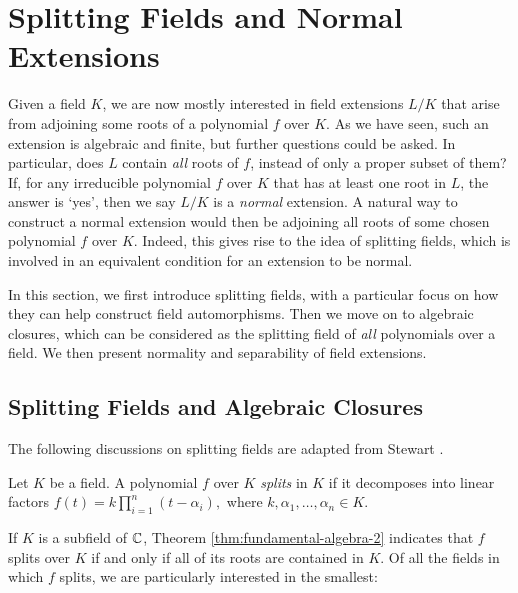 \section{Splitting Fields and Normal Extensions} \label{sec:normal}

Given a field $K$, we are now mostly interested in field extensions $L/K$ that arise from adjoining some roots of a polynomial $f$ over $K$. As we have seen, such an extension is algebraic and finite, but further questions could be asked. In particular, does $L$ contain \textit{all} roots of $f$, instead of only a proper subset of them? If,  for any irreducible polynomial $f$ over $K$ that has at least one root in $L$, the answer is `yes', then we say $L/K$ is a \textit{normal} extension. 
A natural way to construct a normal extension would then be adjoining all roots of some chosen polynomial $f$ over $K$. Indeed, this gives rise to the idea of splitting fields, which is involved in an equivalent condition for an extension to be normal. 

In this section, we first introduce splitting fields, with a particular focus on how they can help construct field automorphisms. Then we move on to algebraic closures, which can be considered as the splitting field of \textit{all} polynomials over a field. We then present normality and separability of field extensions. 



\subsection{Splitting Fields and Algebraic Closures}

The following discussions on splitting fields are adapted from Stewart \cite[Chapter~9]{Stewart}. 
\begin{definition}
    Let $K$ be a field. A polynomial $f$ over $K$ \textit{splits} in $K$ if it decomposes into linear factors $
    f(t) = k \prod _{i=1} ^n (t - \alpha_i),
    $
    where $k, \alpha_1, \ldots, \alpha_n \in K$. 
\end{definition}
If $K$ is a subfield of $\mathbb C$, Theorem \ref{thm:fundamental-algebra-2} indicates that $f$ splits over $K$ if and only if all of its roots are contained in $K$. 
Of all the fields in which $f$ splits, we are particularly interested in the smallest:

